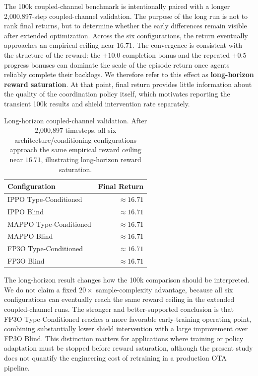 \documentclass[conference]{IEEEtran}
\begin{document}
The 100k coupled-channel benchmark is intentionally paired with a longer 2,000,897-step
coupled-channel validation. The purpose of the long run is not to rank final returns, but
to determine whether the early differences remain visible after extended optimization.
Across the six configurations, the return eventually approaches an empirical ceiling near
$16.71$. The convergence is consistent with the structure of the reward: the $+10.0$
completion bonus and the repeated $+0.5$ progress bonuses can dominate the scale of the
episode return once agents reliably complete their backlogs. We therefore refer to this
effect as \textbf{long-horizon reward saturation}. At that point, final return provides
little information about the quality of the coordination policy itself, which motivates
reporting the transient 100k results and shield intervention rate separately.

\begin{table}[htbp]
\caption{Long-horizon coupled-channel validation. After 2,000,897 timesteps,
all six architecture/conditioning configurations approach the same empirical reward
ceiling near $16.71$, illustrating long-horizon reward saturation.}
\begin{center}
\small
\begin{tabular}{lr}
\toprule
\textbf{Configuration} & \textbf{Final Return} \\
\midrule
IPPO Type-Conditioned & $\approx 16.71$ \\
IPPO Blind & $\approx 16.71$ \\
MAPPO Type-Conditioned & $\approx 16.71$ \\
MAPPO Blind & $\approx 16.71$ \\
FP3O Type-Conditioned & $\approx 16.71$ \\
FP3O Blind & $\approx 16.71$ \\
\bottomrule
\end{tabular}
\label{tab:longhorizon}
\end{center}
\end{table}

The long-horizon result changes how the 100k comparison should be interpreted. We do
not claim a fixed $20\times$ sample-complexity advantage, because all six configurations
can eventually reach the same reward ceiling in the extended coupled-channel runs. The
stronger and better-supported conclusion is that FP3O Type-Conditioned reaches a more
favorable early-training operating point, combining substantially lower shield intervention
with a large improvement over FP3O Blind. This distinction matters for applications where
training or policy adaptation must be stopped before reward saturation, although the present
study does not quantify the engineering cost of retraining in a production OTA pipeline.
\end{document}
